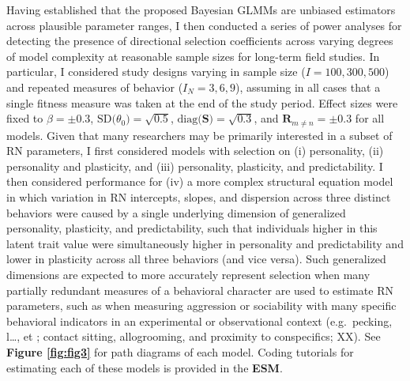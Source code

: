 \documentclass{article}
\begin{document}
Having established that the proposed Bayesian GLMMs are unbiased
estimators across plausible parameter ranges, I then conducted a series
of power analyses for detecting the presence of directional selection
coefficients across varying degrees of model complexity at reasonable
sample sizes for long-term field studies. In particular, I considered
study designs varying in sample size (\(I = 100, 300, 500\)) and
repeated measures of behavior (\(I_{N} = 3,6,9\)), assuming in all cases
that a single fitness measure was taken at the end of the study period.
Effect sizes were fixed to \(\beta = \pm 0.3\),
\(\mathrm{SD(}{\theta_0})=\sqrt{0.5}\),
\(\mathrm{diag({\boldsymbol{S}}})=\sqrt{0.3}\), and
\(\mathrm{\boldsymbol{R}}_{m \neq n}=\pm 0.3\) for all models. Given
that many researchers may be primarily interested in a subset of RN
parameters, I first considered models with selection on (i) personality,
(ii) personality and plasticity, and (iii) personality, plasticity, and
predictability. I then considered performance for (iv) a more complex
structural equation model in which variation in RN intercepts, slopes,
and dispersion across three distinct behaviors were caused by a single
underlying dimension of generalized personality, plasticity, and
predictability, such that individuals higher in this latent trait value
were simultaneously higher in personality and predictability and lower
in plasticity across all three behaviors (and vice versa). Such
generalized dimensions are expected to more accurately represent
selection when many partially redundant measures of a behavioral
character are used to estimate RN parameters, such as when measuring
aggression or sociability with many specific behavioral indicators in an
experimental or observational context (e.g.~pecking, l\ldots, et ;
contact sitting, allogrooming, and proximity to conspecifics; XX). See
\textbf{Figure \ref{fig:fig3}} for path diagrams of each model. Coding
tutorials for estimating each of these models is provided in the
\textbf{ESM}.
\end{document}
